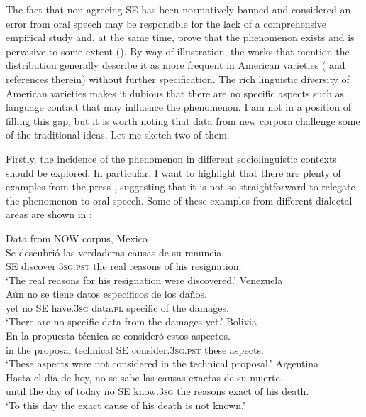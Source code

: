 \documentclass[output=paper,colorlinks,citecolor=brown]{langscibook}
\begin{document}
The fact that non-agreeing SE has been normatively banned and
considered an error from oral speech may be responsible for the lack of a comprehensive empirical study and, at the same time, prove that the phenomenon exists and is pervasive to some extent (\citealt[36]{SanchezLopez2002}). By way of illustration, the works that mention the distribution generally describe it as more frequent in American varieties (\citealt{Mendikoetxea1999} and references therein) without further specification. The rich linguistic diversity of American varieties makes it dubious that there are no specific aspects such as language contact that may influence the phenomenon. I am not in a position of filling this gap, but it is worth noting that data from new corpora challenge some of the traditional ideas. Let me sketch two of them.

Firstly, the incidence of the phenomenon in different sociolinguistic contexts should be explored. In particular, I want to highlight that there are plenty of examples from the press \citep[see][]{Arias_Fernandez2020}, suggesting that it is not so straightforward to relegate the phenomenon to oral speech. Some of these examples from different dialectal areas are shown in :

\ea\label{ex:05:NOW} Data from NOW corpus, \citep{Davies}
    \ea Mexico \label{ex:05:NOWa}\\
        \gll Se descubrió las verdaderas causas de su renuncia.\\
        SE discover.\textsc{3sg.pst} the real reasons of his resignation. \\
        \glt ‘The real reasons for his resignation were discovered.’
    \ex Venezuela \label{ex:05:NOWb}\\
        \gll Aún no se tiene datos específicos de los daños. \\
        yet no SE have.\textsc{3sg} data.\textsc{pl}  specific of the damages. \\
        \glt ‘There are no specific data from the damages yet.’
    \ex Bolivia \label{ex:05:NOWc} \\
        \gll En la propuesta técnica se consideró estos aspectos. \\
        in the proposal technical SE consider.\textsc{3sg.pst} these aspects. \\
        \glt ‘These aspects were not considered in the technical proposal.’
    \ex Argentina \label{ex:05:NOWd} \\
        \gll  Hasta el día de hoy, no se sabe las causas exactas de su muerte. \\
        until the day of today no SE know.\textsc{3sg} the reasons exact of his death.\\
        \glt ‘To this day the exact cause of his death is not known.’
\z \z
\end{document}
